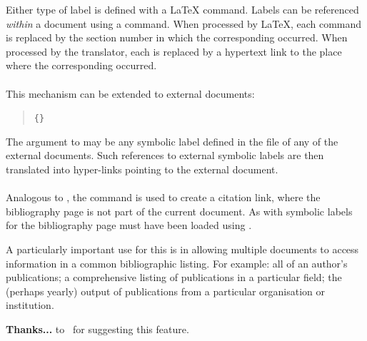 Either type of label is defined with a \LaTeX{}  command.  
Labels can be referenced \textit{within} a document using a  command.
When processed by \LaTeX, each  command is replaced by the 
section number in which the corresponding  occurred.
When processed by the translator, each  is replaced by 
a hypertext link to the place where the corresponding  occurred.%
 

%
%
\paragraph*{\label{externref}}
This mechanism can be extended to external documents:
\begin{quote}
\begin{small}
\verb|{|\verb|}|
\end{small}
\end{quote}
The argument to  may be any symbolic label defined 
in the  file of any of the external documents.
Such references to external symbolic labels are then translated
into hyper-links pointing to the external document.%


%
%
\paragraph*{\label{externcite}}
%
Analogous to ,
the  command is used to create a citation link,
where the bibliography page is not part of the current document.
As with  symbolic labels for the bibliography page
must have been loaded using 
.

A particularly important use for this is in allowing multiple documents 
to access information in a common bibliographic listing.
For example: all of an author's publications; 
a comprehensive listing of publications in a particular field; 
the (perhaps yearly) output of publications 
from a particular organisation or institution.

\medskip\noindent
\textbf{Thanks...} to \Engberg\ for suggesting this feature.

